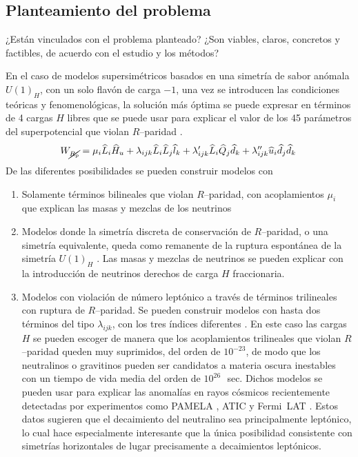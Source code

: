 \begin{ideas}
\subsection{Planteamiento del problema}
\begin{instrucciones}
  ¿Están vinculados con el problema planteado? ¿Son viables, claros, concretos y factibles, de acuerdo con el estudio y los métodos?
\end{instrucciones}

En el caso de modelos supersimétricos basados en una simetría de sabor anómala $U(1)_H$, con un solo flavón de carga $-1$, una vez se introducen las condiciones teóricas y fenomenológicas, la solución más óptima se puede expresar en términos de 4 cargas $H$ libres que se puede usar para explicar el valor de los 45 parámetros del superpotencial que violan $R$--paridad \cite{Mira:2000gg,Dreiner:2003hw,Dreiner:2003yr,Dreiner:2007vp,Dreiner:2006xw,Sierra:2009zq}. 
\begin{equation}
  \label{eq:5}
  W_{\cancel{R_p}} = \mu_i\widehat{L}_i\widehat{H}_u +
  \lambda_{i j k}\widehat{L}_i\widehat{L}_j\widehat{l}_k +
  \lambda'_{i j k}\widehat{L}_i\widehat{Q}_j\widehat{d}_k +
  \lambda''_{ijk}\widehat{u}_i\widehat{d}_j\widehat{d}_k\,
\end{equation}
De las diferentes posibilidades se pueden construir modelos con
\begin{enumerate}
\item Solamente términos bilineales que violan $R$--paridad, con acoplamientos $\mu_i$ que explican las masas y mezclas de los neutrinos \cite{Mira:2000gg,Dreiner:2003hw,Dreiner:2006xw}
\label{item:1}
\item Modelos donde la simetría discreta de conservación de $R$--paridad, o una simetría equivalente, queda como remanente de la ruptura espontánea de la simetría $U(1)_H$ \cite{Dreiner:2003hw,Dreiner:2003yr,Dreiner:2007vp}. Las masas y mezclas de neutrinos se pueden explicar con la introducción de neutrinos derechos de carga $H$ fraccionaria.
\label{item:2}
\item Modelos con violación de número leptónico a través de términos trilineales con ruptura de $R$--paridad. Se pueden construir modelos con hasta dos términos del tipo $\lambda_{ijk}$, con los tres índices diferentes \cite{Sierra:2009zq}.  En este caso las cargas $H$ se pueden escoger de manera que los acoplamientos trilineales que violan $R$--paridad queden muy suprimidos, del orden de $10^{-23}$, de modo que los neutralinos o gravitinos pueden ser candidatos a materia oscura inestables con un tiempo de vida media del orden de $10^{26}\,$~sec. Dichos modelos se pueden usar para explicar las anomalías en rayos cósmicos \cite{Sierra:2009zq} recientemente detectadas por experimentos como PAMELA \cite{Adriani:2008zr}, ATIC \cite{:2008zzr} y Fermi~LAT \cite{Abdo:2009zk}. Estos datos sugieren que el decaimiento del neutralino sea principalmente leptónico, lo cual hace especialmente interesante que la única posibilidad consistente con simetrías horizontales de lugar precisamente a decaimientos leptónicos.

\end{enumerate}
\end{ideas}
